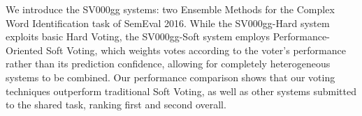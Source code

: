 We introduce the SV000gg systems: two Ensemble Methods for the Complex Word Identification task of SemEval 2016. While the SV000gg-Hard system exploits basic Hard Voting, the SV000gg-Soft system employs Performance-Oriented Soft Voting, which weights votes according to the voter's performance rather than its prediction confidence, allowing for completely heterogeneous systems to be combined. Our performance comparison shows that our voting techniques outperform traditional Soft Voting, as well as other systems submitted to the shared task, ranking first and second overall.
